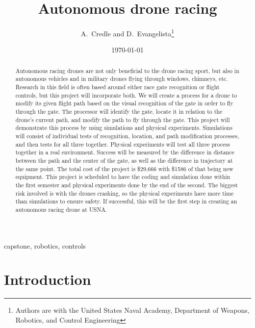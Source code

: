 \documentclass[onecolumn,10pt]{IEEEtran}
\title{Autonomous drone racing}
\author{A.~Credle and D.~Evangelista\thanks{Authors are with the United States Naval Academy, Department of Weapons, Robotics, and Control Engineering}}
\date{\today}
\begin{document}
\maketitlepage
\maketitle

\begin{abstract}
Autonomous racing drones are not only beneficial to the drone racing sport, but also in autonomous vehicles and in military drones flying through windows, chimneys, etc. Research in this field is often based around either race gate recognition or flight controls, but this project will incorporate both. We will create a process for a drone to modify its given flight path based on the visual recognition of the gate in order to fly through the gate. The processor will identify the gate, locate it in relation to the drone’s current path, and modify the path to fly through the gate. This project will demonstrate this process by using simulations and physical experiments. Simulations will consist of individual tests of recognition, location, and path modification processes, and then tests for all three together. Physical experiments will test all three process together in a real environment. Success will be measured by the difference in distance between the path and the center of the gate, as well as the difference in trajectory at the same point. The total cost of the project is \$29,666 with \$1586 of that being new equipment. This project is scheduled to have the coding and simulation done within the first semester and physical experiments done by the end of the second. The biggest risk involved is with the drones crashing, so the physical experiments have more time than simulations to ensure safety. If successful, this will be the first step in creating an autonomous racing drone at USNA.
\end{abstract}

\begin{IEEEkeywords}
capstone, robotics, controls
\end{IEEEkeywords}

\section{Introduction}
\end{document}
